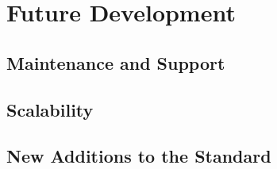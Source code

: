\chapter{Future Development} \label{futuredevelopment}
\section{Maintenance and Support}
\section{Scalability} \label{scalability}
\section{New Additions to the Standard}